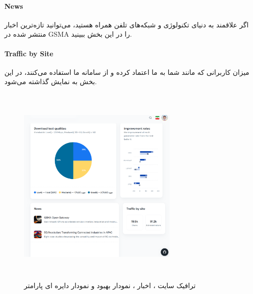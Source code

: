 \documentclass{report}
\begin{document}
\paragraph{News}
اگر علاقمند به دنیای تکنولوژی و شبکه‌های تلفن همراه هستید، می‌توانید تازه‌ترین اخبار منتشر شده در GSMA را در این بخش ببینید.

\paragraph{Traffic by Site}
میزان کاربرانی که مانند شما به ما اعتماد کرده و از سامانه ما استفاده می‌کنند، در این بخش به نمایش گذاشته می‌شود.

 \begin{figure}[ht]
	\centering
	\includegraphics[width=0.7\textwidth,height=10cm,keepaspectratio]{Pic/traffic}
	\caption{ترافیک سایت ، اخبار ، نمودار بهبود و نمودار دایره ای پارامتر}
	\label{fig:traffic}
\end{figure}
\end{document}
